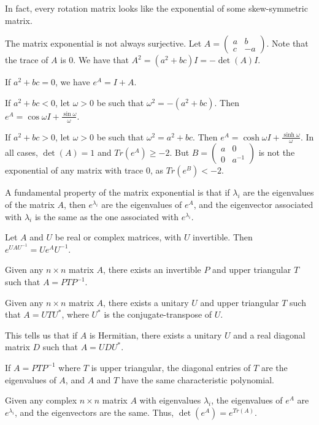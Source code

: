 In fact, every rotation matrix looks like the exponential of some skew-symmetric matrix.

The matrix exponential is not always surjective.  Let $A=\begin{pmatrix} a&b\\c&-a\end{pmatrix}$.  Note that the trace of $A$ is $0$.  We have that $A^2=(a^2+bc)I=-\det(A)I$. 

 If $a^2+bc=0$, we have $e^A=I+A$.
 
 If $a^2+bc<0$, let $\omega>0$ be such that $\omega^2=-(a^2+bc)$. Then $e^A=\cos\omega I+\frac{\sin\omega}{\omega}$.
 
 If $a^2+bc>0$, let $\omega>0$ be such that $\omega^2=a^2+bc$.  Then $e^A=\cosh\omega I + \frac{\sinh\omega}{\omega}$.  In all cases, $\det(A)=1$ and $Tr(e^A)\geq -2$.  But $B=\begin{pmatrix}a&0\\0&a^{-1}\end{pmatrix}$ is not the exponential of any matrix with trace $0$, as $Tr(e^B)<-2$.
 
 A fundamental property of the matrix exponential is that if $\lambda_i$ are the eigenvalues of the matrix $A$, then $e^{\lambda_i}$ are the eigenvalues of $e^A$, and the eigenvector associated with $\lambda_i$ is the same as the one associated with $e^{\lambda_i}$.
 
 \begin{lemma}
 	Let $A$ and $U$ be real or complex matrices, with $U$ invertible.  Then $e^{UAU^{-1}}=Ue^AU^{-1}$.
 \end{lemma}
\begin{lemma}
	Given any $n\times n$ matrix $A$, there exists an invertible $P$ and upper triangular $T$ such that $A=PTP^{-1}$.  
\end{lemma}
\begin{lemma}[Schur]
	Given any $n\times n$ matrix $A$, there exists a unitary $U$ and upper triangular $T$ such that $A=UTU^*$, where $U^*$ is the conjugate-transpose of $U$.
\end{lemma}

This tells us that if $A$ is Hermitian, there exists a unitary $U$ and a real diagonal matrix $D$ such that $A=UDU^*$.

If $A=PTP^{-1}$ where $T$ is upper triangular, the diagonal entries of $T$ are the eigenvalues of $A$, and $A$ and $T$ have the same characteristic polynomial.

\begin{lemma}
	Given any complex $n\times n$ matrix $A$ with eigenvalues $\lambda_i$, the eigenvalues of $e^A$ are $e^{\lambda_i}$, and the eigenvectors are the same.  Thus, $\det(e^A)=e^{Tr(A)}$.
\end{lemma}